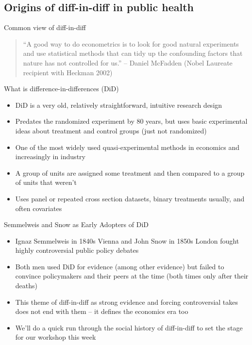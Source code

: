 \documentclass{beamer}
\begin{document}
\subsection{Origins of diff-in-diff in public health}



\begin{frame}{Common view of diff-in-diff}
\begin{quote}
``A good way to do econometrics is to look for good natural experiments and use statistical methods that can tidy up the confounding factors that nature has not controlled for us.'' -- Daniel McFadden (Nobel Laureate recipient with Heckman 2002)
\end{quote}

\end{frame}



\begin{frame}{What is difference-in-differences (DiD)}

\begin{itemize}
\item DiD is a very old, relatively straightforward, intuitive research design
\item Predates the randomized experiment by 80 years, but uses basic experimental ideas about treatment and control groups (just not randomized)
\item One of the most widely used quasi-experimental methods in economics and increasingly in industry
\item A group of units are assigned some treatment and then compared to a group of units that weren't
\item Uses panel or repeated cross section datasets, binary treatments usually, and often covariates
\end{itemize}
\end{frame}






\begin{frame}{Semmelweis and Snow as Early Adopters of DiD}

\begin{itemize}

\item Ignaz Semmelweis in 1840s Vienna and John Snow in 1850s London fought highly controversial public policy debates 
\item Both men used DiD for evidence (among other evidence) but failed to convince policymakers and their peers at the time (both times only after their deaths)
\item This theme of diff-in-diff as strong evidence and forcing controversial takes does not end with them -- it defines the economics era too
\item We'll do a quick run through the social history of diff-in-diff to set the stage for our workshop this week

\end{itemize}

\end{frame}
\end{document}
